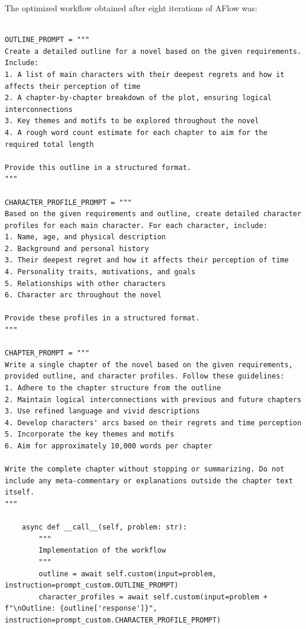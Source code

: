 \documentclass{article} %
\newcommand{\model}{{\sc AFlow}\xspace}
\theoremstyle{plain}
\theoremstyle{definition}
\theoremstyle{remark}
\begin{document}
The optimized workflow obtained after eight iterations of \model was:

\label{appendix:novel generation workflow}

\begin{tcolorbox}[title={\textbf{\small Novel generation workflow}}, boxrule=2pt, arc=0mm, breakable]\begin{verbatim}

OUTLINE_PROMPT = """
Create a detailed outline for a novel based on the given requirements. Include:
1. A list of main characters with their deepest regrets and how it affects their perception of time
2. A chapter-by-chapter breakdown of the plot, ensuring logical interconnections
3. Key themes and motifs to be explored throughout the novel
4. A rough word count estimate for each chapter to aim for the required total length

Provide this outline in a structured format.
"""

CHARACTER_PROFILE_PROMPT = """
Based on the given requirements and outline, create detailed character profiles for each main character. For each character, include:
1. Name, age, and physical description
2. Background and personal history
3. Their deepest regret and how it affects their perception of time
4. Personality traits, motivations, and goals
5. Relationships with other characters
6. Character arc throughout the novel

Provide these profiles in a structured format.
"""

CHAPTER_PROMPT = """
Write a single chapter of the novel based on the given requirements, provided outline, and character profiles. Follow these guidelines:
1. Adhere to the chapter structure from the outline
2. Maintain logical interconnections with previous and future chapters
3. Use refined language and vivid descriptions
4. Develop characters' arcs based on their regrets and time perception
5. Incorporate the key themes and motifs
6. Aim for approximately 10,000 words per chapter

Write the complete chapter without stopping or summarizing. Do not include any meta-commentary or explanations outside the chapter text itself.
"""

    async def __call__(self, problem: str):
        """
        Implementation of the workflow
        """
        outline = await self.custom(input=problem, instruction=prompt_custom.OUTLINE_PROMPT)
        character_profiles = await self.custom(input=problem + f"\nOutline: {outline['response']}", instruction=prompt_custom.CHARACTER_PROFILE_PROMPT)
        

\end{verbatim}
\end{tcolorbox}
\end{document}
